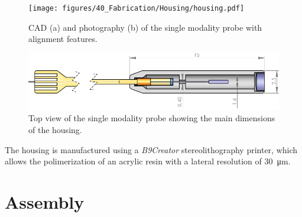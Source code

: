 \begin{figure}[h!]\centering \texttt{[image: figures/40\_Fabrication/Housing/housing.pdf]}
      \caption{CAD (a) and photography (b) of the single modality probe with alignment features.}
      \label{fig:housing}
\end{figure}

\begin{figure}[h!]\centering \includegraphics[width=\columnwidth]{figures/40_Fabrication/Housing/TopDrawing.pdf}
      \caption{Top view of the single modality probe showing the main dimensions of the housing.}
      \label{fig:housingDim}
\end{figure}

The housing is manufactured using a \textit{B9Creator} stereolithography printer, which allows the polimerization of an acrylic resin with a lateral resolution of \SI{30}{\micro\meter}.


%

\section{Assembly}

%


